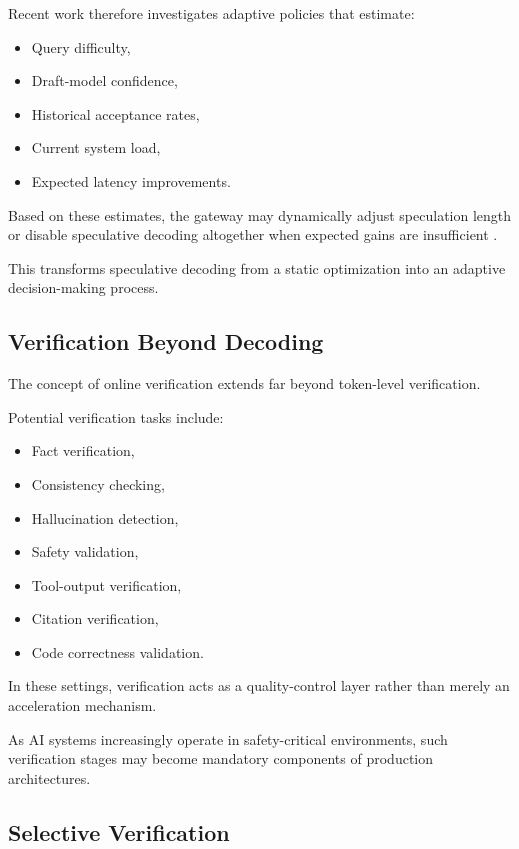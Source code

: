 \documentclass[11pt,a4paper]{article}
\begin{document}
Recent work therefore investigates adaptive policies that estimate:

\begin{itemize}
\item Query difficulty,
\item Draft-model confidence,
\item Historical acceptance rates,
\item Current system load,
\item Expected latency improvements.
\end{itemize}

Based on these estimates, the gateway may dynamically adjust speculation length or disable speculative decoding altogether when expected gains are insufficient \cite{su2023synergy}.

This transforms speculative decoding from a static optimization into an adaptive decision-making process.

\subsection{Verification Beyond Decoding}

The concept of online verification extends far beyond token-level verification.

Potential verification tasks include:

\begin{itemize}
\item Fact verification,
\item Consistency checking,
\item Hallucination detection,
\item Safety validation,
\item Tool-output verification,
\item Citation verification,
\item Code correctness validation.
\end{itemize}

In these settings, verification acts as a quality-control layer rather than merely an acceleration mechanism.

As AI systems increasingly operate in safety-critical environments, such verification stages may become mandatory components of production architectures.

\subsection{Selective Verification}
\end{document}
